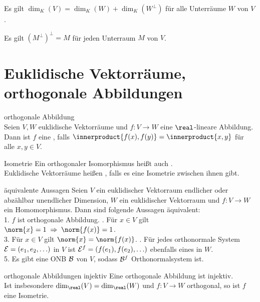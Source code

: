 \begin{Kor}
    Es gilt $\dim_K(V) = \dim_K(W) + \dim_K(W^\bot)$ für alle Unterräume
    $W$ von $V$.
\end{Kor}

\begin{Kor}
    Es gilt $(M^\bot)^\bot = M$ für jeden Unterraum $M$ von $V$.
\end{Kor}

\section{%
    Euklidische Vektorräume, orthogonale Abbildungen%
}

\begin{Def}{orthogonale Abbildung} \\
    Seien $V, W$ euklidische Vektorräume und $f: V \rightarrow W$ eine
    $\real$-lineare Abbildung. \\
    Dann ist $f$ eine , falls
    $\innerproduct{f(x), f(y)} = \innerproduct{x, y}$ für alle $x, y \in V$.
\end{Def}

\begin{Def}{Isometrie}
    Ein orthogonaler Isomorphismus heißt auch . \\
    Euklidische Vektorräume heißen , falls es eine
    Isometrie zwischen ihnen gibt.
\end{Def}

\begin{Satz}{äquivalente Aussagen}
    Seien $V$ ein euklidischer Vektorraum endlicher oder abzählbar unendlicher
    Dimension, $W$ ein euklidischer Vektorraum und $f: V \rightarrow W$ ein
    Homomorphismus.
    Dann sind folgende Aussagen äquivalent: \\
    1. $f$ ist orthogonale Abbildung. . Für $x \in V$ gilt
    $\norm{x} = 1 \;\Rightarrow\; \norm{f(x)} = 1$. \\
    3. Für $x \in V$ gilt $\norm{x} = \norm{f(x)}$. . Für jedes orthonormale System $\mathcal{E} = (e_1, e_2, \ldots)$ in $V$
    ist $\mathcal{E}^f = (f(e_1), f(e_2), \ldots)$ ebenfalls eines in $W$. \\
    5. Es gibt eine ONB $\mathcal{B}$ von $V$, sodass $\mathcal{B}^f$
    Orthonormalsystem ist.
\end{Satz}

\begin{Satz}{orthogonale Abbildungen injektiv}
    Eine orthogonale Abbildung ist injektiv. \\
    Ist insbesondere $\dim_\real(V) = \dim_\real(W)$ und $f: V \rightarrow W$
    orthogonal, so ist $f$ eine Isometrie.
\end{Satz}

